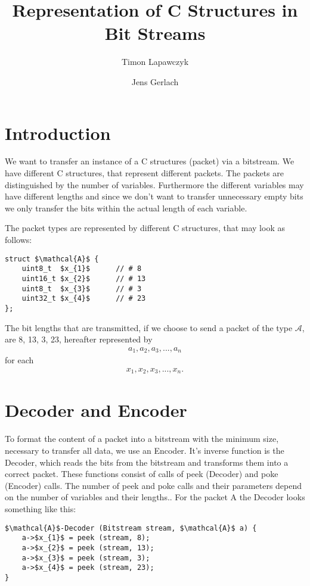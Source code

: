 \documentclass[paper=a4,DIV=12]{scrartcl}
\title{Representation of C Structures in Bit Streams}
\author{Timon Lapawczyk \and Jens Gerlach}
\begin{document}
\maketitle

\section{Introduction}

We want to transfer an instance of a C structures (packet) via a bitstream.
We have different C structures, that represent different packets.
The packets are distinguished by the number of variables.
Furthermore the different variables may have different lengths and
since we don't want to transfer unnecessary empty bits we only transfer
the bits within the actual length of each variable.

The packet types are represented by different C structures, that may look as follows:

\begin{lstlisting}[mathescape]
struct $\mathcal{A}$ {
	uint8_t  $x_{1}$      // # 8
	uint16_t $x_{2}$      // # 13
	uint8_t  $x_{3}$      // # 3
	uint32_t $x_{4}$      // # 23
};
\end{lstlisting}

The bit lengths that are transmitted, if we choose to send a packet of the type $\mathcal{A}$, are 8, 13, 3, 23, hereafter represented by 
\begin{align*}
	a_{1}, a_{2}, a_{3}, ... , a_{n}
\end{align*}
for each
\begin{align*}
	x_{1}, x_{2}, x_{3}, ... , x_{n}.
\end{align*}

\section{Decoder and Encoder}

To format the content of a packet into a bitstream with the minimum size, necessary to transfer all data, we use an Encoder.
It's inverse function is the Decoder, which reads the bits
from the bitstream and transforms them into a correct packet.
These functions consist of calls of peek (Decoder) and poke (Encoder) calls.
The number of peek and poke calls and their parameters depend on the number of variables and their lengths..
For the packet A the Decoder looks something like this:

\begin{lstlisting}[mathescape]
$\mathcal{A}$-Decoder (Bitstream stream, $\mathcal{A}$ a) {
	a->$x_{1}$ = peek (stream, 8);
	a->$x_{2}$ = peek (stream, 13);
	a->$x_{3}$ = peek (stream, 3);
	a->$x_{4}$ = peek (stream, 23);
}
\end{lstlisting}
\end{document}
